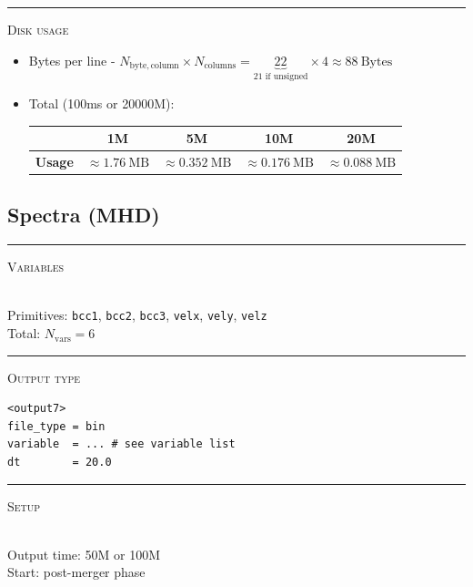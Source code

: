 \documentclass{article}
\newcommand{\var}[1]{%
  {\setlength{\fboxsep}{1.5pt}%
   \colorbox{varbg}{\textcolor{varfg}{\texttt{\small #1}}}}}
\newcommand{\step}[1]{%
  \par\medskip\noindent
  {\color{stepfg}\rule[-0.15ex]{2pt}{1.5ex}\hspace{0.5em}\scshape #1}%
  \hspace{0.75em}\ignorespaces}
\begin{document}
\step{Disk usage}
\begin{itemize}
  \item Bytes per line - $N_{\mathrm{byte, column}}\times N_{\mathrm{columns}}=\underbrace{22}_{\text{21 if unsigned}}\times 4\approx 88\ \mathrm{Bytes}$
  \item Total (100ms or 20000M):
  \begin{raggedleft}
    \begin{tabular}{|c|c|c|c|c|}
      \hline
      &\textbf{1M}&\textbf{5M}&\textbf{10M}&\textbf{20M}\\
      \hline
      \textbf{Usage}&$\approx 1.76\ \mathrm{MB}$&$\approx 0.352\ \mathrm{MB}$&$\approx 0.176\ \mathrm{MB}$&$\approx 0.088\ \mathrm{MB}$\\
      \hline
    \end{tabular}
  \end{raggedleft}
\end{itemize}

\subsection*{Spectra (MHD)}
\step{Variables}\mbox{}\\
Primitives: \var{bcc1}, \var{bcc2}, \var{bcc3}, \var{velx}, \var{vely}, \var{velz}\\
Total: $\boxed{N_{\mathrm{vars}}=6}$

\step{Output type}
\begin{verbatim}
<output7>
file_type = bin
variable  = ... # see variable list
dt        = 20.0
\end{verbatim}

\step{Setup}\mbox{}\\
Output time: 50M or 100M\\
Start: post-merger phase
\end{document}
